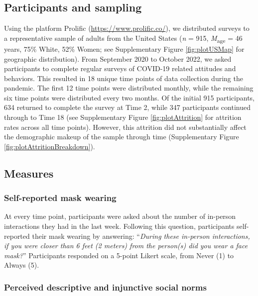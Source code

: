 \documentclass[
  man, donotrepeattitle,floatsintext]{apa6}
\begin{document}
\hypertarget{participants-and-sampling}{%
\subsection{Participants and sampling}\label{participants-and-sampling}}

Using the platform Prolific (\url{https://www.prolific.co/}), we distributed surveys to a representative sample of adults from the United States (\emph{n} = 915, \emph{M}\textsubscript{age} = 46 years, 75\% White, 52\% Women; see Supplementary Figure \ref{fig:plotUSMap} for geographic distribution). From September 2020 to October 2022, we asked participants to complete regular surveys of COVID-19 related attitudes and behaviors. This resulted in 18 unique time points of data collection during the pandemic. The first 12 time points were distributed monthly, while the remaining six time points were distributed every two months. Of the initial 915 participants, 634 returned to complete the survey at Time 2, while 347 participants continued through to Time 18 (see Supplementary Figure \ref{fig:plotAttrition} for attrition rates across all time points). However, this attrition did not substantially affect the demographic makeup of the sample through time (Supplementary Figure \ref{fig:plotAttritionBreakdown}).

\hypertarget{measures}{%
\subsection{Measures}\label{measures}}

\hypertarget{self-reported-mask-wearing}{%
\subsubsection{Self-reported mask wearing}\label{self-reported-mask-wearing}}

At every time point, participants were asked about the number of in-person interactions they had in the last week. Following this question, participants self-reported their mask wearing by answering: ``\emph{During these in-person interactions, if you were closer than 6 feet (2 meters) from the person(s) did you wear a face mask?}'' Participants responded on a 5-point Likert scale, from Never (1) to Always (5).

\hypertarget{perceived-descriptive-and-injunctive-social-norms}{%
\subsubsection{Perceived descriptive and injunctive social norms}\label{perceived-descriptive-and-injunctive-social-norms}}
\end{document}
